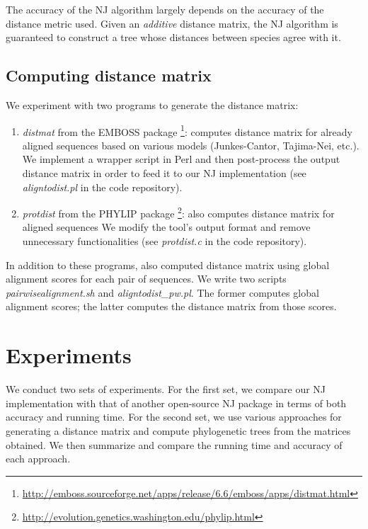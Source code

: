 \documentclass[11pt,letterpaper]{article}
\theoremstyle{definition}
\begin{document}
The accuracy of the NJ algorithm largely depends on the accuracy of the distance metric used. Given an \textit{additive} distance matrix, the NJ algorithm is guaranteed to construct a tree whose distances between species agree with it. 

\subsection{Computing distance matrix}\label{distance}


We experiment with two programs to generate the distance matrix:
\begin{enumerate}
	\item \textit{distmat} from the EMBOSS package \cite{rice2000emboss}  \footnote{\url{http://emboss.sourceforge.net/apps/release/6.6/emboss/apps/distmat.html}}: computes distance matrix for already aligned sequences based on various models (Junkes-Cantor, Tajima-Nei, etc.). We implement a wrapper script in Perl and then post-process the output distance matrix in order to feed it to our NJ implementation (see \textit{aligntodist.pl} in the code repository).
        \item \textit{protdist} from the PHYLIP package \footnote{\url{http://evolution.genetics.washington.edu/phylip.html}}: also computes distance matrix for aligned sequences We modify the tool's output format and remove unnecessary functionalities (see \textit{protdist.c} in the code repository).
\end{enumerate}

In addition to these programs, also computed distance matrix using global alignment scores for each pair of sequences. We write two scripts \textit{pairwisealignment.sh} and \textit{aligntodist\_pw.pl}. The former computes global alignment scores; the latter computes the distance matrix from those scores.

\section{Experiments}

We conduct two sets of experiments. For the first set, we compare our NJ implementation with that of another open-source NJ package in terms of both accuracy and running time. For the second set, we use various approaches for generating a distance matrix and compute phylogenetic trees from the matrices obtained. We then summarize and compare the running time and accuracy of each approach. 
\end{document}
